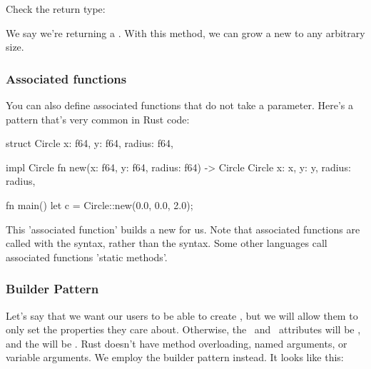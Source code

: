 Check the return type:

\begin{rustc}
fn grow(&self, increment: f64) -> Circle {
\end{rustc}

We say we're returning a . With this method, we can grow a new  to any arbitrary size.

\subsubsection*{Associated functions}

You can also define associated functions that do not take a  parameter. Here's a pattern that's very common in Rust code:

\begin{rustc}
struct Circle {
    x: f64,
    y: f64,
    radius: f64,
}

impl Circle {
    fn new(x: f64, y: f64, radius: f64) -> Circle {
        Circle {
            x: x,
            y: y,
            radius: radius,
        }
    }
}

fn main() {
    let c = Circle::new(0.0, 0.0, 2.0);
}
\end{rustc}

This 'associated function' builds a new  for us. Note that associated functions are called with the  
syntax, rather than the  syntax. Some other languages call associated functions 'static methods'.

\subsubsection*{Builder Pattern}

Let's say that we want our users to be able to create , but we will allow them to only set the properties they care about. 
Otherwise, the \x\ and \y\ attributes will be , and the  will be . Rust doesn't have method overloading, 
named arguments, or variable arguments. We employ the builder pattern instead. It looks like this:

